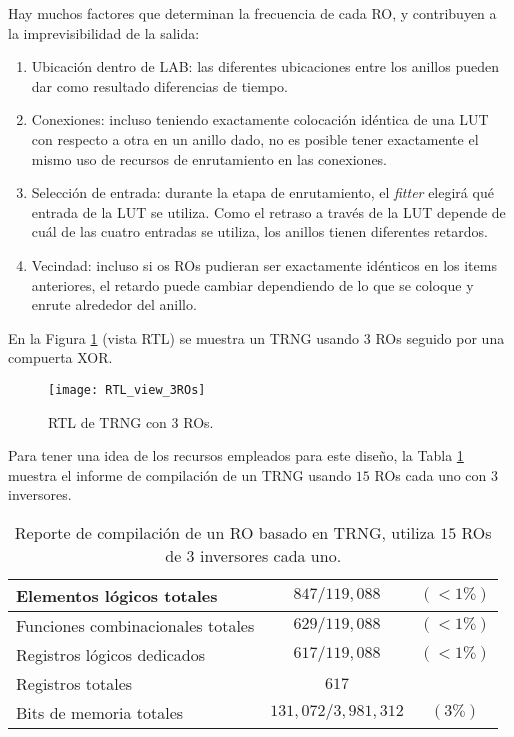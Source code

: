 Hay muchos factores que determinan la frecuencia de cada {RO}, y contribuyen a la imprevisibilidad de la salida:
\begin{enumerate}
\item Ubicación dentro de {LAB}: las diferentes ubicaciones entre los anillos pueden dar como resultado diferencias de tiempo.
\item Conexiones: incluso teniendo exactamente colocación idéntica de una {LUT} con respecto a otra en un anillo dado, no es posible tener exactamente el mismo {uso de recursos de enrutamiento} en las conexiones.
\item Selección de entrada: durante la etapa de enrutamiento, el \emph{fitter} elegirá qué entrada de la {LUT} se utiliza. Como el retraso a través de la {LUT} depende de cuál de las cuatro entradas se utiliza, los anillos tienen diferentes retardos.
\item Vecindad: incluso si os ROs pudieran ser exactamente idénticos en los items anteriores, el retardo puede cambiar dependiendo de lo que se coloque y enrute alrededor del anillo.
\end{enumerate}


En la Figura \ref{fig:RTL3rings} (vista RTL) se muestra un {TRNG} usando $3$ {RO}s seguido por una compuerta XOR.
%
\begin{figure}
\begin{center}
\texttt{[image: RTL\_view\_3ROs]}
\caption{{RTL} de {TRNG} con $3$ {RO}s.}
\label{fig:RTL3rings}
\end{center}
\end{figure}

Para tener una idea de los recursos empleados para este diseño, la Tabla \ref{table:compilation} muestra el informe de compilación de un {TRNG} usando $15$ {RO}s cada uno con $3$ inversores.
\begin{table}
\begin{center}
\begin{tabular}{| l | c  c | }
	\hline
	\footnotesize{Elementos lógicos totales}         & $847/119,088$       & $( < 1 \%)$ \\ \hline
	\footnotesize{Funciones combinacionales totales} & $629/119,088$       & $( < 1 \%)$ \\ \hline
	\footnotesize{Registros lógicos dedicados}       & $617/119,088$       & $( < 1 \%)$ \\ \hline
	\footnotesize{Registros totales}                 & $617$               &             \\ \hline
	\footnotesize{Bits de memoria totales}           & $131,072/3,981,312$ & $( 3 \%)$   \\ \hline
\end{tabular}
\end{center}
\caption{Reporte de compilación de un {RO} basado en {TRNG}, utiliza $15$ {RO}s de $3$ inversores cada uno.}
\label{table:compilation}
\end{table}

